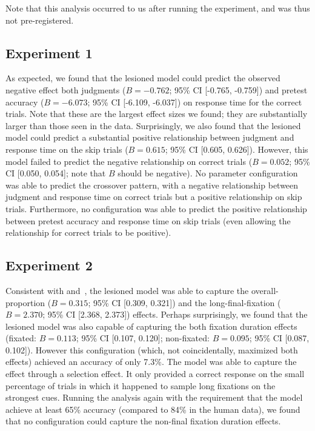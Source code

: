 Note that this analysis occurred to us after running the experiment, and was thus not pre-registered.

\subsection{Experiment 1}

As expected, we found that the lesioned model could predict the observed negative effect both judgments ($B = -0.762$; 95\% CI [-0.765, -0.759]) and pretest accuracy ($B = -6.073$; 95\% CI [-6.109, -6.037]) on response time for the correct trials. Note that these are the largest effect sizes we found; they are substantially larger than those seen in the data. Surprisingly, we also found that the lesioned model could predict a substantial positive relationship between judgment and response time on the skip trials ($B = 0.615$; 95\% CI [0.605, 0.626]). However, this model failed to predict the negative relationship on correct trials ($B = 0.052$; 95\% CI [0.050, 0.054]; note that $B$ should be negative). No parameter configuration was able to predict the crossover pattern, with a negative relationship between judgment and response time on correct trials but a positive relationship on skip trials. Furthermore, no configuration was able to predict the positive relationship between pretest accuracy and response time on skip trials (even allowing the relationship for correct trials to be positive).

\subsection{Experiment 2}

Consistent with  and~, the lesioned model was able to capture the overall-proportion ($B = 0.315$; 95\% CI [0.309, 0.321]) and the long-final-fixation ($B = 2.370$; 95\% CI [2.368, 2.373]) effects. Perhaps surprisingly, we found that the lesioned model was also capable of capturing the both fixation duration effects (fixated: $B = 0.113$; 95\% CI [0.107, 0.120]; non-fixated: $B = 0.095$; 95\% CI [0.087, 0.102]). However this configuration (which, not coincidentally, maximized both effects) achieved an accuracy of only 7.3\%. The model was able to capture the effect through a selection effect. It only provided a correct response on the small percentage of trials in which it happened to sample long fixations on the strongest cues. Running the analysis again with the requirement that the model achieve at least 65\% accuracy (compared to 84\% in the human data), we found that no configuration could capture the non-final fixation duration effects.


